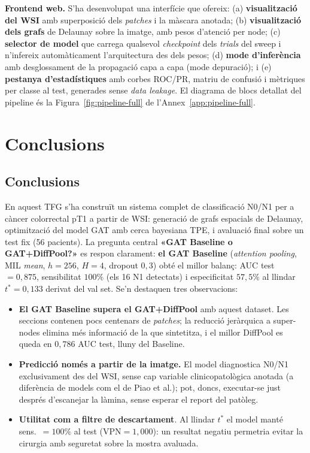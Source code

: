 \documentclass[10pt,a4paper,twocolumn,twoside]{article}
\begin{document}
\textbf{Frontend web.} S'ha desenvolupat una interfície que
ofereix: (a) \textbf{visualització del WSI} amb superposició dels \textit{patches} i la màscara
anotada; (b) \textbf{visualització dels grafs} de Delaunay sobre la imatge, amb pesos d'atenció per
node; (c) \textbf{selector de model} que carrega qualsevol \textit{checkpoint} dels
\textit{trials} del sweep i n'infereix automàticament l'arquitectura des dels pesos; (d) \textbf{mode
d'inferència} amb desglossament de la propagació capa a capa (mode depuració); i (e) \textbf{pestanya
d'estadístiques} amb corbes ROC/PR, matriu de confusió i mètriques per classe al test, generades
sense \textit{data leakage}. El diagrama de blocs detallat del pipeline és la
Figura~\ref{fig:pipeline-full} de l'Annex~\ref{app:pipeline-full}.

\section{Conclusions}

\subsection{Conclusions}

En aquest TFG s'ha construït un sistema complet de classificació N0/N1 per a càncer
colorrectal pT1 a partir de WSI: generació de grafs espacials de Delaunay, optimització
del model GAT amb cerca bayesiana TPE, i avaluació final sobre un test fix (56 pacients).
La pregunta central \textbf{«GAT Baseline o GAT+DiffPool?»} es respon clarament:
\textbf{el GAT Baseline} (\textit{attention pooling}, MIL \textit{mean}, $h\!=\!256$,
$H\!=\!4$, dropout $0{,}3$) obté el millor balanç: AUC test $=0{,}875$, sensibilitat
$100\%$ (els 16 N1 detectats) i especificitat $57{,}5\%$ al llindar $t^*\!=\!0{,}133$
derivat del val set. Se'n destaquen tres observacions:

\begin{itemize}
  \item \textbf{El GAT Baseline supera el GAT+DiffPool} amb aquest dataset. Les seccions
  contenen pocs centenars de \textit{patches}; la reducció jeràrquica a super-nodes
  elimina més informació de la que sintetitza, i el millor DiffPool es queda en
  $0{,}786$ AUC test, lluny del Baseline.
  \item \textbf{Predicció només a partir de la imatge.} El model diagnostica N0/N1
  exclusivament des del WSI, sense cap variable clinicopatològica anotada (a diferència de
  models com el de Piao et al.); pot, doncs, executar-se just després d'escanejar la làmina,
  sense esperar el report del patòleg.
  \item \textbf{Utilitat com a filtre de descartament}. Al llindar $t^*$ el model manté
  sens.\ $=100\%$ al test ($\text{VPN}\!=\!1{,}000$): un resultat negatiu permetria evitar
  la cirurgia amb seguretat sobre la mostra avaluada.
\end{itemize}
\end{document}
